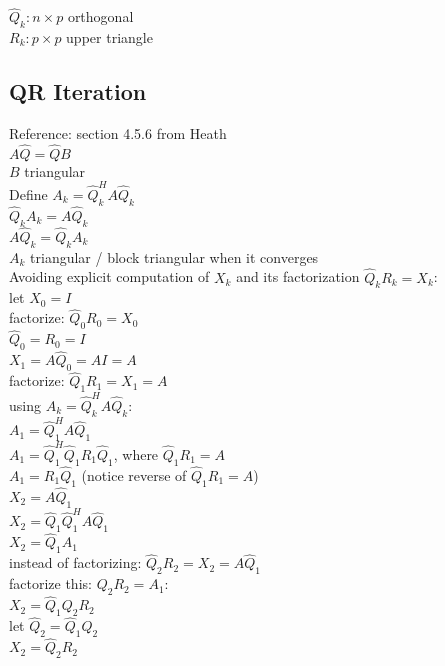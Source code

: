 \documentclass[8pt,letter]{article}
\begin{document}
\begin{multicols*}{2}
    $\hat{Q}_k:  n \times p$ orthogonal\\
    $R_k:  p \times p$ upper triangle\\

       
    
    \subsection{QR Iteration}
    Reference: section 4.5.6 from Heath\\
    
    $A\hat{Q} = \hat{Q}B$\\
    $B$ triangular\\

    Define $A_k = \hat{Q}_k^H A \hat{Q}_k$\\
    $\hat{Q}_k A_k = A \hat{Q}_k$\\
    $A \hat{Q}_k = \hat{Q}_k A_k$\\
    $A_k$ triangular / block triangular when it converges\\

    Avoiding explicit computation of $X_k$ and its factorization $\hat{Q}_k R_k = X_k$:\\
    let $X_0 = I$\\
    factorize: $\hat{Q}_0 R_0 = X_0$\\
    $\hat{Q}_0 = R_0 = I$\\
    $X_1 = A \hat{Q}_0 = A I = A$\\
    factorize: $\hat{Q}_1 R_1 = X_1 = A$\\
    using $A_k = \hat{Q}_k^H A \hat{Q}_k$:\\
    $A_1 = \hat{Q}_1^H A \hat{Q}_1$\\
    $A_1 = \hat{Q}_1^H \hat{Q}_1 R_1 \hat{Q}_1$, where $\hat{Q}_1 R_1 = A$\\
    $A_1 = R_1 \hat{Q}_1$ (notice reverse of $\hat{Q}_1 R_1 = A$)\\
    $X_2 = A \hat{Q}_1$\\
   
    $X_2 = \hat{Q}_1 \hat{Q}_1^H A \hat{Q}_1$\\
    $X_2 = \hat{Q}_1 A_1$\\

    instead of factorizing: $\hat{Q}_2 R_2 = X_2 = A \hat{Q}_1$\\
    factorize this: $Q_2 R_2 = A_1$:\\
    $X_2 = \hat{Q}_1 Q_2 R_2$\\
    let $\hat{Q}_2 = \hat{Q}_1 Q_2$\\
    $X_2 = \hat{Q}_2 R_2$\\


\end{multicols*}
\end{document}
